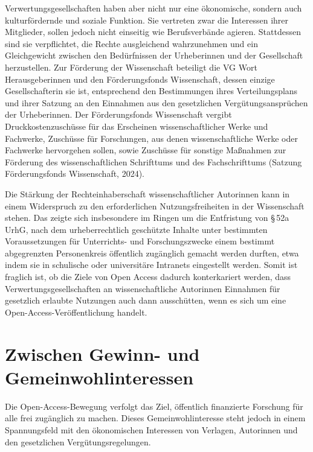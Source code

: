 \documentclass[a4paper,
fontsize=11pt,
oneside,
numbers=noperiodatend,
parskip=half-,
bibliography=totoc,
final
]{scrartcl}
\begin{document}
Verwertungsgesellschaften haben aber nicht nur eine ökonomische, sondern
auch kulturfördernde und soziale Funktion. Sie vertreten zwar die
Interessen ihrer Mitglieder, sollen jedoch nicht einseitig wie
Berufsverbände agieren. Stattdessen sind sie verpflichtet, die Rechte
ausgleichend wahrzunehmen und ein Gleichgewicht zwischen den
Bedürfnissen der Urheberinnen und der Gesellschaft herzustellen. Zur
Förderung der Wissenschaft beteiligt die VG Wort Herausgeberinnen und
den Förderungsfonds Wissenschaft, dessen einzige Gesellschafterin sie
ist, entsprechend den Bestimmungen ihres Verteilungsplans und ihrer
Satzung an den Einnahmen aus den gesetzlichen Vergütungsansprüchen der
Urheberinnen. Der Förderungsfonds Wissenschaft vergibt
Druckkostenzuschüsse für das Erscheinen wissenschaftlicher Werke und
Fachwerke, Zuschüsse für Forschungen, aus denen wissenschaftliche Werke
oder Fachwerke hervorgehen sollen, sowie Zuschüsse für sonstige
Maßnahmen zur Förderung des wissenschaftlichen Schrifttums und des
Fachschrifttums (Satzung Förderungsfonds Wissenschaft, 2024).

Die Stärkung der Rechteinhaberschaft wissenschaftlicher Autorinnen kann
in einem Widerspruch zu den erforderlichen Nutzungsfreiheiten in der
Wissenschaft stehen. Das zeigte sich insbesondere im Ringen um die
Entfristung von §\,52a UrhG, nach dem urheberrechtlich geschützte
Inhalte unter bestimmten Voraussetzungen für Unterrichts- und
Forschungszwecke einem bestimmt abgegrenzten Personenkreis öffentlich
zugänglich gemacht werden durften, etwa indem sie in schulische oder
universitäre Intranets eingestellt werden. Somit ist fraglich ist, ob
die Ziele von Open Access dadurch konterkariert werden, dass
Verwertungsgesellschaften an wissenschaftliche Autorinnen Einnahmen für
gesetzlich erlaubte Nutzungen auch dann ausschütten, wenn es sich um
eine Open-Access-Veröffentlichung handelt.

\hypertarget{zwischen-gewinn--und-gemeinwohlinteressen}{%
\section{Zwischen Gewinn- und
Gemeinwohlinteressen}\label{zwischen-gewinn--und-gemeinwohlinteressen}}

Die Open-Access-Bewegung verfolgt das Ziel, öffentlich finanzierte
Forschung für alle frei zugänglich zu machen. Dieses Gemeinwohlinteresse
steht jedoch in einem Spannungsfeld mit den ökonomischen Interessen von
Verlagen, Autorinnen und den gesetzlichen Vergütungsregelungen.
\end{document}
